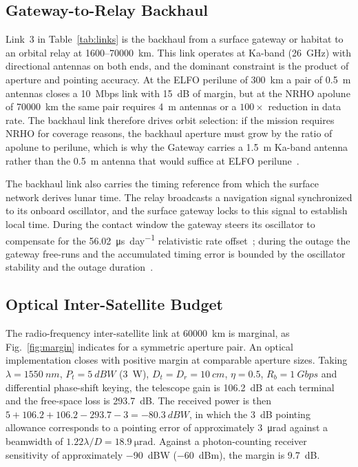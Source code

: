 \documentclass[11pt,a4paper]{article}
\begin{document}
\subsection{Gateway-to-Relay Backhaul}
Link~3 in Table~\ref{tab:links} is the backhaul from a surface gateway or habitat to an orbital relay at \SI{1600}{}--\SI{70000}{km}. This link operates at Ka-band (\SI{26}{GHz}) with directional antennas on both ends, and the dominant constraint is the product of aperture and pointing accuracy. At the ELFO perilune of \SI{300}{km} a pair of \SI{0.5}{m} antennas closes a \SI{10}{Mbps} link with \SI{15}{dB} of margin, but at the NRHO apolune of \SI{70000}{km} the same pair requires \SI{4}{m} antennas or a $100\times$ reduction in data rate. The backhaul link therefore drives orbit selection: if the mission requires NRHO for coverage reasons, the backhaul aperture must grow by the ratio of apolune to perilune, which is why the Gateway carries a \SI{1.5}{m} Ka-band antenna rather than the \SI{0.5}{m} antenna that would suffice at ELFO perilune~\cite{gateway_comm,ppe_comm_links}.

The backhaul link also carries the timing reference from which the surface network derives lunar time. The relay broadcasts a navigation signal synchronized to its onboard oscillator, and the surface gateway locks to this signal to establish local time. During the contact window the gateway steers its oscillator to compensate for the \SI{56.02}{\micro\second\per day} relativistic rate offset~\cite{ashby_lunar_time}; during the outage the gateway free-runs and the accumulated timing error is bounded by the oscillator stability and the outage duration~\cite{ansalone_lcrns_time}.

\subsection{Optical Inter-Satellite Budget}
The radio-frequency inter-satellite link at \SI{60000}{km} is marginal, as Fig.~\ref{fig:margin} indicates for a symmetric aperture pair. An optical implementation closes with positive margin at comparable aperture sizes. Taking $\lambda = \SI{1550}{nm}$, $P_t = \SI{+5}{dBW}$ (\SI{3}{W}), $D_t = D_r = \SI{10}{cm}$, $\eta = 0.5$, $R_b = \SI{1}{Gbps}$ and differential phase-shift keying, the telescope gain is \SI{106.2}{dB} at each terminal and the free-space loss is \SI{293.7}{dB}. The received power is then $5 + 106.2 + 106.2 - 293.7 - 3 = \SI{-80.3}{dBW}$, in which the \SI{3}{dB} pointing allowance corresponds to a pointing error of approximately \SI{3}{\micro\radian} against a beamwidth of $1.22\lambda/D = \SI{18.9}{\micro\radian}$. Against a photon-counting receiver sensitivity of approximately \SI{-90}{dBW} (\SI{-60}{dBm}), the margin is \SI{9.7}{dB}.
\end{document}
